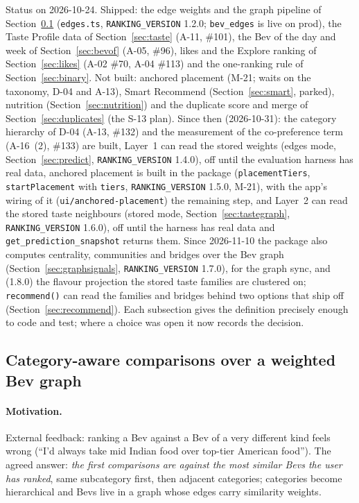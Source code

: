 \documentclass[11pt]{article}
\newcommand{\code}[1]{\texttt{#1}}
\theoremstyle{plain}
\theoremstyle{definition}
\theoremstyle{remark}
\begin{document}
Status on 2026-10-24. Shipped: the edge weights and the graph pipeline of Section~\ref{sec:anchored} (\code{edges.ts}, \code{RANKING\_VERSION} 1.2.0; \code{bev\_edges} is live on prod), the Taste Profile data of Section~\ref{sec:taste} (A-11, \#101), the Bev of the day and week of Section~\ref{sec:bevof} (A-05, \#96), likes and the Explore ranking of Section~\ref{sec:likes} (A-02 \#70, A-04 \#113) and the one-ranking rule of Section~\ref{sec:binary}. Not built: anchored placement (M-21; waits on the taxonomy, D-04 and A-13), Smart Recommend (Section~\ref{sec:smart}, parked), nutrition (Section~\ref{sec:nutrition}) and the duplicate score and merge of Section~\ref{sec:duplicates} (the S-13 plan). Since then (2026-10-31): the category hierarchy of D-04 (A-13, \#132) and the measurement of the co-preference term (A-16~(2), \#133) are built, Layer~1 can read the stored weights (edges mode, Section~\ref{sec:predict}, \code{RANKING\_VERSION} 1.4.0), off until the evaluation harness has real data, anchored placement is built in the package (\code{placementTiers}, \code{startPlacement} with \code{tiers}, \code{RANKING\_VERSION} 1.5.0, M-21), with the app's wiring of it (\code{ui/anchored-placement}) the remaining step, and Layer~2 can read the stored taste neighbours (stored mode, Section~\ref{sec:tastegraph}, \code{RANKING\_VERSION} 1.6.0), off until the harness has real data and \code{get\_prediction\_snapshot} returns them. Since 2026-11-10 the package also computes centrality, communities and bridges over the Bev graph (Section~\ref{sec:graphsignals}, \code{RANKING\_VERSION} 1.7.0), for the graph sync, and (1.8.0) the flavour projection the stored taste families are clustered on; \code{recommend()} can read the families and bridges behind two options that ship off (Section~\ref{sec:recommend}). Each subsection gives the definition precisely enough to code and test; where a choice was open it now records the decision.

\subsection{Category-aware comparisons over a weighted Bev graph}\label{sec:anchored}

\paragraph{Motivation.} External feedback: ranking a Bev against a Bev of a very different kind feels wrong (``I'd always take mid Indian food over top-tier American food''). The agreed answer: \emph{the first comparisons are against the most similar Bevs the user has ranked}, same subcategory first, then adjacent categories; categories become hierarchical and Bevs live in a graph whose edges carry similarity weights.
\end{document}

